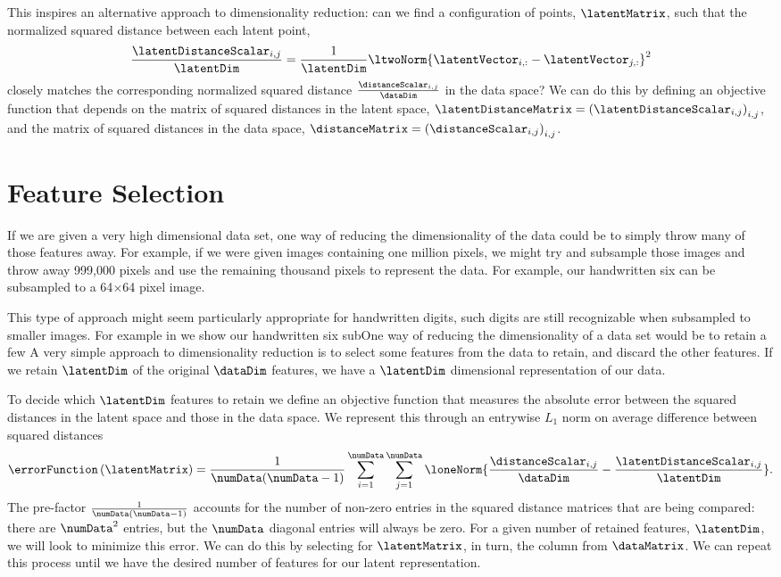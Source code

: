 This inspires an alternative approach to dimensionality reduction: can
we find a configuration of points, $\latentMatrix$, such that the
normalized squared distance between each latent point,
\[
\frac{\latentDistanceScalar_{i,j}}{\latentDim}=\frac{1}{\latentDim}\ltwoNorm{\latentVector_{i,:}-\latentVector_{j,:}}^2
\]
closely matches the corresponding normalized squared distance
$\frac{\distanceScalar_{i,j}}{\dataDim}$ in the data space? We can do
this by defining an objective function that depends on the matrix of
squared distances in the latent space,
$\latentDistanceMatrix=\left(\latentDistanceScalar_{i,j}\right)_{i,j}$,
and the matrix of squared distances in the data space,
$\distanceMatrix=\left(\distanceScalar_{i,j}\right)_{i,j}$.

\section{Feature Selection}

If we are given a very high dimensional data set, one way of reducing the dimensionality of the data could be to simply throw many of those features away. For example, if we were given images containing one million pixels, we might try and subsample those images and throw away 999,000 pixels and use the remaining thousand pixels to represent the data. For example, our handwritten six can be subsampled to a 64$\times$64 pixel image.

This type of approach might seem particularly appropriate for handwritten digits, such digits are still recognizable when subsampled to smaller images. For example in  we show our handwritten six subOne way of reducing the dimensionality of a data set would be to retain a few 
A very simple approach to dimensionality reduction is to select
some features from the data to retain, and discard the other
features. If we retain $\latentDim$ of the original $\dataDim$
features, we have a $\latentDim$ dimensional representation of our
data.

To decide which $\latentDim$ features to retain we define an objective
function that measures the absolute error between the squared
distances in the latent space and those in the data space. We
represent this through an entrywise $L_{1}$ norm on average difference
between squared distances
\[
\errorFunction\left(\latentMatrix\right)=\frac{1}{\numData(\numData-1)}\sum_{i=1}^{\numData}\sum_{j=1}^{\numData}\loneNorm{\frac{\distanceScalar_{i,j}}{\dataDim}-\frac{\latentDistanceScalar_{i,j}}{\latentDim}}.
\]
The pre-factor $\frac{1}{\numData(\numData-1)}$ accounts for the
number of non-zero entries in the squared distance matrices that are
being compared: there are $\numData^2$ entries, but the $\numData$
diagonal entries will always be zero.  For a given number of retained
features, $\latentDim$, we will look to minimize this error. We can do
this by selecting for $\latentMatrix$, in turn, the column from
$\dataMatrix$. We can repeat this process until we have the desired
number of features for our latent representation.


